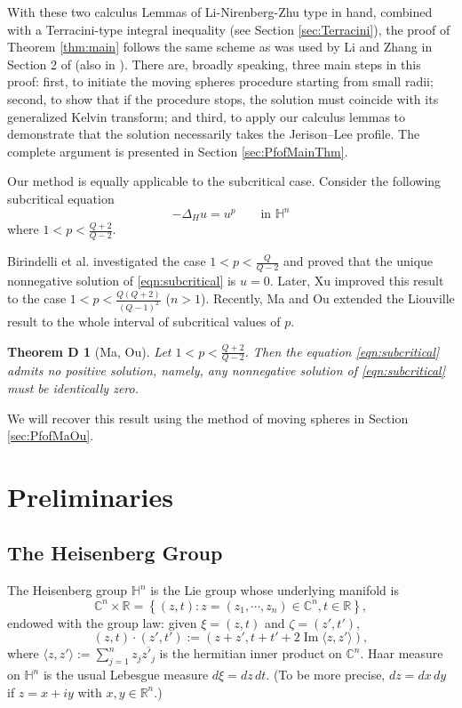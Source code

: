 \documentclass[reqno]{amsart}
\newtheorem*{thmd}{Theorem D}
\theoremstyle{definition}
\theoremstyle{remark}
\numberwithin{equation}{section}
\begin{document}
With these two calculus Lemmas of Li-Nirenberg-Zhu type in hand, combined with a Terracini-type integral 
inequality (see Section \ref{sec:Terracini}), the proof of Theorem \ref{thm:main} follows the same scheme as 
was used by Li and Zhang in Section 2 of \cite{LZ03} (also in \cite{LZ95}). There are, broadly speaking, 
three main steps in this proof: first, to initiate the moving spheres procedure starting from small radii; 
second, to show that if the procedure stops, the solution must coincide with its generalized Kelvin 
transform; and third, to apply our calculus lemmas to demonstrate that the solution necessarily takes 
the Jerison–Lee profile. The complete argument is presented in Section \ref{sec:PfofMainThm}.

Our method is equally applicable to the subcritical case.
Consider the following subcritical equation
\begin{equation}\label{eqn:subcritical}
-\Delta_{\! H} u = u^{p} \qquad \text{in } \mathbb{H}^n
\end{equation}
where $1<p < \frac {Q+2}{Q-2}$.
  
Birindelli et al. \cite{BCC97} investigated the case $1<p<\frac {Q}{Q-2}$ and proved that the unique 
nonnegative solution of \eqref{eqn:subcritical} is $u=0$. Later, Xu \cite{Xu09} improved this result 
to the case $1<p < \frac {Q(Q+2)}{(Q-1)^2}$ ($n>1$). Recently, Ma and Ou \cite{MO23} extended the 
Liouville result to the whole interval of subcritical values of $p$.

\begin{thmd}[Ma, Ou] \label{thm:subcritical}
Let \(1<p<\frac{Q+2}{Q-2}\). Then the equation \eqref{eqn:subcritical}
admits no positive solution, namely, any nonnegative solution of \eqref{eqn:subcritical} must be identically zero.
\end{thmd}

We will recover this result using the method of moving spheres in Section \ref{sec:PfofMaOu}.


\section{Preliminaries}
\label{sec:preli}

\subsection{The Heisenberg Group}
\label{subsec:Heisenberg}

The Heisenberg group $\mathbb{H}^{n}$ is the Lie group whose underlying manifold is
\[
\mathbb{C}^{n} \times \mathbb{R}=\left\{(z, t): z=\left(z_{1}, \cdots, z_{n}\right) \in \mathbb{C}^{n}, t \in \mathbb{R}\right\},
\]
endowed with the group law: given $\xi=(z,t)$ and $\zeta=\left(z', t'\right)$,
\begin{equation}\label{eqn:grouplaw}
(z, t) \cdot \left(z', t'\right):=\left(z+z', t+t'+2 \operatorname{Im} \langle z, z'\rangle \right),
\end{equation}
where $\langle z, z'\rangle :=\sum_{j=1}^{n} z_{j} \overline{z'_j}$ is the hermitian inner product on $\mathbb{C}^n$. Haar measure on $\mathbb{H}^n$ is the usual Lebesgue measure $d\xi=dz\,dt$. (To be more precise, $dz=dx\,dy$ if $z=x+iy$ with $x,y\in\mathbb{R}^n$.) 
\end{document}
